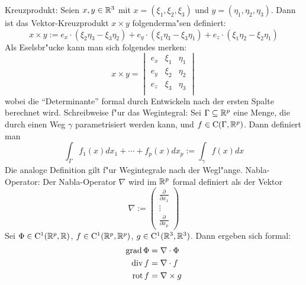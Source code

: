  Kreuzprodukt:{
  Seien $x,y\in\mathbb R^3$ mit $x=(\xi_1,\xi_2,\xi_3)$ und $y=(\eta_1,\eta_2,\eta_3)$.
  Dann ist das Vektor-Kreuzprodukt $x\times y$ folgenderma"sen definiert:
  \[x\times y:=e_x\cdot(\xi_2\eta_3-\xi_3\eta_2)+
               e_y\cdot(\xi_1\eta_3-\xi_3\eta_1)+
	       e_z\cdot(\xi_1\eta_2-\xi_2\eta_1)\]
  Als Eselsbr"ucke kann man sich folgendes merken:
  \[x\times y=\begin{vmatrix}
      e_x & \xi_1 & \eta_1 \\
      
      e_y & \xi_2 & \eta_2 \\
      e_z & \xi_3 & \eta_3 \\
      \end{vmatrix}
    \]
  wobei die ``Determinante'' formal durch Entwickeln nach der ersten Spalte
  berechnet wird.
  }
 Schreibweise f"ur das Wegintegral:{
  Sei $\Gamma\subseteq\mathbb R^p$ eine Menge, die durch einen Weg $\gamma$ 
  parametrisiert werden kann, und $f\in{\rm C}(\Gamma,\mathbb R^p)$. Dann 
  definiert man 
  \[\int_\Gamma f_1(x)dx_1+\cdots+f_p(x)dx_p:=\int_\gamma f(x) dx
    \]
  Die analoge Definition gilt f"ur Wegintegrale nach der Wegl"ange.
  }
 Nabla-Operator:{
  Der Nabla-Operator $\nabla$ wird im $\mathbb R^p$ formal definiert als der Vektor
  \[\nabla:=\begin{pmatrix} 
      \frac \partial {\partial x_1} \\
      \vdots \\
      \frac \partial {\partial x_p}
      \end{pmatrix}
    \]
  Sei $\Phi\in{\rm C}^1(\mathbb R^p,\mathbb R)$, $f\in{\rm C}^1(\mathbb R^p,\mathbb R^p)$,
  $g\in{\rm C}^1(\mathbb R^3,\mathbb R^3)$. Dann ergeben sich formal:
  \begin{align*}
    \operatorname{grad}\Phi &= \nabla\cdot\Phi \\
    \operatorname{div} f &= \nabla\cdot f \\
    \operatorname{rot} f &= \nabla\times g
    \end{align*}    
  }
